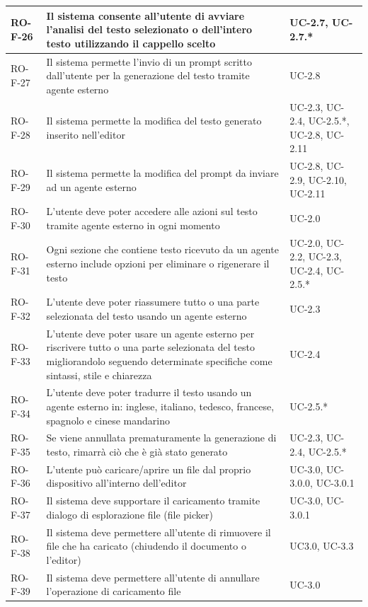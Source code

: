 \documentclass[11pt,a4paper]{article}
\begin{document}
\begin{longtable}{|p{}|>{\raggedright\arraybackslash}p{}|p{}|}
\hline
RO-F-26 & Il sistema consente all'utente di avviare l'analisi del testo selezionato o dell'intero testo utilizzando il cappello scelto & UC-2.7, UC-2.7.* \\
\hline
RO-F-27 & Il sistema permette l'invio di un prompt scritto dall’utente per la generazione del testo tramite agente esterno & UC-2.8 \\
\hline
RO-F-28 & Il sistema permette la modifica del testo generato inserito nell'editor & UC-2.3, UC-2.4, UC-2.5.*, UC-2.8, UC-2.11 \\
\hline
RO-F-29 & Il sistema permette la modifica del prompt da inviare ad un agente esterno & UC-2.8, UC-2.9, UC-2.10, UC-2.11 \\
\hline
RO-F-30 & L'utente deve poter accedere alle azioni sul testo tramite agente esterno in ogni momento & UC-2.0 \\
\hline
RO-F-31 & Ogni sezione che contiene testo ricevuto da un agente esterno include opzioni per eliminare o rigenerare il testo & UC-2.0, UC-2.2, UC-2.3, UC-2.4, UC-2.5.* \\
\hline
RO-F-32 & L'utente deve poter riassumere tutto o una parte selezionata del testo usando un agente esterno & UC-2.3 \\
\hline
RO-F-33 &  L'utente deve poter usare un agente esterno per riscrivere tutto o una parte selezionata del testo migliorandolo seguendo determinate specifiche come sintassi, stile e chiarezza & UC-2.4 \\
\hline
RO-F-34 & L'utente deve poter tradurre il testo usando un agente esterno in: inglese, italiano, tedesco, francese, spagnolo e cinese mandarino & UC-2.5.* \\
\hline
RO-F-35 & Se viene annullata prematuramente la generazione di testo, rimarrà ciò che è già stato generato & UC-2.3, UC-2.4, UC-2.5.* \\
\hline
RO-F-36 & L'utente può caricare/aprire un file dal proprio dispositivo all'interno dell'editor & UC-3.0, UC-3.0.0, UC-3.0.1 \\
\hline
RO-F-37 & Il sistema deve supportare il caricamento tramite dialogo di esplorazione file (file picker) & UC-3.0, UC-3.0.1 \\
\hline
RO-F-38 & Il sistema deve permettere all'utente di rimuovere il file che ha caricato (chiudendo il documento o l'editor) & UC3.0, UC-3.3 \\
\hline
RO-F-39 & Il sistema deve permettere all'utente di annullare l'operazione di caricamento file & UC-3.0 \\
\hline

\end{longtable}
\end{document}
